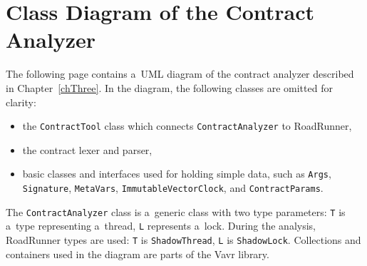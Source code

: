 \chapter{Class Diagram of the Contract Analyzer}
\label{diagram}

The following page contains a~UML diagram of the contract analyzer described in
Chapter~\ref{chThree}. In the diagram, the following classes are omitted for
clarity:
\begin{itemize}
    \item the \texttt{ContractTool} class which connects
    \texttt{ContractAnalyzer} to RoadRunner,
    \item the contract lexer and parser,
    \item basic classes and interfaces used for holding simple data, such as
    \texttt{Args}, \texttt{Signature}, \texttt{MetaVars},
    \texttt{ImmutableVectorClock}, and \texttt{ContractParams}.
\end{itemize}

The \texttt{ContractAnalyzer} class is a~generic class with two type parameters:
\texttt{T} is a~type representing a~thread, \texttt{L} represents a~lock. During
the analysis, RoadRunner types are used: \texttt{T} is \texttt{ShadowThread},
\texttt{L} is \texttt{ShadowLock}. Collections and containers used in the
diagram are parts of the Vavr library.

\pagebreak

